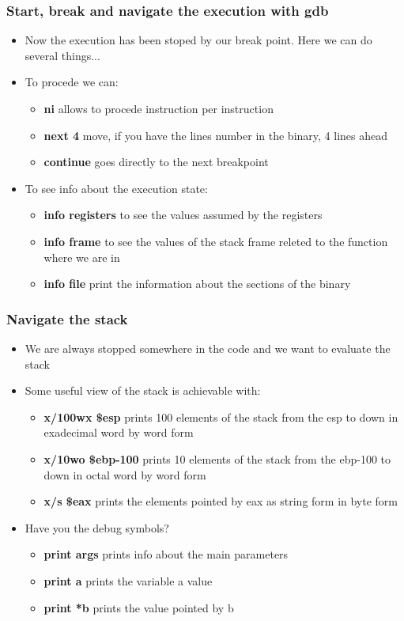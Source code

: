 \documentclass[]{beamer}
\begin{document}
\begin{frame}
  \frametitle{Start, break and navigate the execution with gdb}
  \begin{itemize}
  \item{Now the execution has been stoped by our break point. Here we can do several things...}
  \item{To procede we can:}
    \begin{itemize}
    \item{{\bf ni} allows to procede instruction per instruction}
    \item{{\bf next 4} move, if you have the lines number in the binary, 4 lines ahead}
    \item{{\bf continue} goes directly to the next breakpoint}
    \end{itemize}
  \item{To see info about the execution state:}
    \begin{itemize}
    \item{{\bf info registers} to see the values assumed by the registers}
    \item{{\bf info frame} to see the values of the stack frame releted to the function where we are in}
    \item{{\bf info file} print the information about the sections of the binary}
    \end{itemize}
  \end{itemize}
\end{frame}
\begin{frame}
  \frametitle{Navigate the stack}
  \begin{itemize}
  \item{We are always stopped somewhere in the code and we want to evaluate the stack}
  \item{Some useful view of the stack is achievable with:}
    \begin{itemize}
    \item{{\bf x/100wx \$esp} prints 100 elements of the stack from the esp to down in exadecimal word by word form}
    \item{{\bf x/10wo \$ebp-100} prints 10 elements of the stack from the ebp-100 to down in octal word by word form}
    \item{{\bf x/s \$eax} prints the elements pointed by eax as string form in byte form }
    \end{itemize}
  \item{Have you the debug symbols?}
    \begin{itemize}
    \item{{\bf print args} prints info about the main parameters}
    \item{{\bf print a} prints the variable a value}
    \item{{\bf print *b} prints the value pointed by b}
    \end{itemize}
  \end{itemize}
\end{frame}
\end{document}
